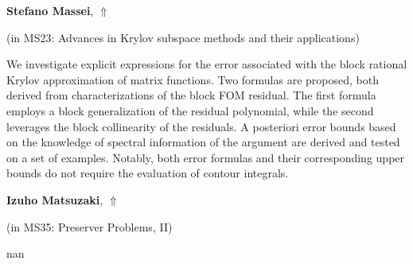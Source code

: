 \documentclass[ILAS2025-program.tex]{subfiles}
\begin{document}
\hypertarget{down0240}{}\begin{ilasabstract}
    
\textbf{Stefano Massei},  \hfill \hyperlink{up0240}{$\Uparrow$}
    
    
(in {\color{mstitle}MS23: Advances in Krylov subspace methods and their applications})
        
\mtskip
    We investigate explicit expressions for the error associated with the block rational Krylov approximation of matrix functions. Two formulas are proposed, both derived from  characterizations of the block FOM residual. The first formula employs a block generalization of the residual polynomial, while the second leverages the block collinearity of the residuals. A posteriori error bounds based on the knowledge 
of spectral information of the argument are derived and tested on a set of examples. Notably, both error formulas and their corresponding upper bounds do not require the evaluation of contour integrals.  

\end{ilasabstract}
    

\hypertarget{down0249}{}\begin{ilasabstract}
    
\textbf{Izuho Matsuzaki},  \hfill \hyperlink{up0249}{$\Uparrow$}
    
    
(in {\color{mstitle}MS35: Preserver Problems, II})
        
\mtskip
    nan
\end{ilasabstract}
    
\end{document}

